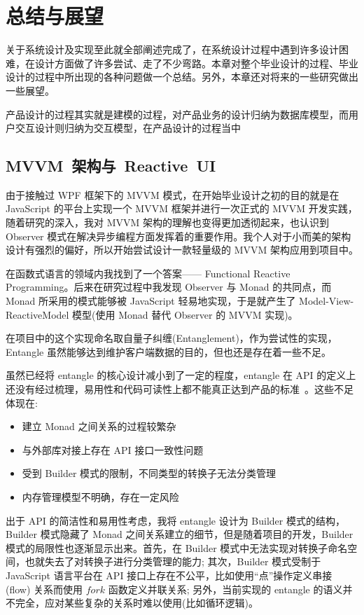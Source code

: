 \chapter{总结与展望}

关于系统设计及实现至此就全部阐述完成了，在系统设计过程中遇到许多设计困难，在设计方面做了许多尝试、走了不少弯路。本章对整个毕业设计的过程、毕业设计的过程中所出现的各种问题做一个总结。另外，本章还对将来的一些研究做出一些展望。

产品设计的过程其实就是建模的过程，对产品业务的设计归纳为数据库模型，而用户交互设计则归纳为交互模型，在产品设计的过程当中

\section{MVVM~架构与~Reactive~UI}

由于接触过 WPF 框架下的 MVVM 模式，在开始毕业设计之初的目的就是在 JavaScript 的平台上实现一个 MVVM 框架并进行一次正式的 MVVM 开发实践，随着研究的深入，我对 MVVM 架构的理解也变得更加透彻起来，也认识到 Observer 模式在解决异步编程方面发挥着的重要作用。我个人对于小而美的架构设计有强烈的偏好，所以开始尝试设计一款轻量级的 MVVM 架构应用到项目中。

在函数式语言的领域内我找到了一个答案—— Functional Reactive Programming。后来在研究过程中我发现 Observer 与 Monad 的共同点，而 Monad 所采用的模式能够被 JavaScript 轻易地实现，于是就产生了 Model-View-ReactiveModel 模型(使用 Monad 替代 Observer 的 MVVM 实现)。

在项目中的这个实现命名取自量子纠缠(Entanglement)，作为尝试性的实现，Entangle 虽然能够达到维护客户端数据的目的，但也还是存在着一些不足。

虽然已经将 entangle 的核心设计减小到了一定的程度，entangle 在 API 的定义上还没有经过梳理，易用性和代码可读性上都不能真正达到产品的标准~\cite{Gerken:2010:UCM:1753846.1754082}。这些不足体现在:

\begin{itemize}
  \item 建立 Monad 之间关系的过程较繁杂
  \item 与外部库对接上存在 API 接口一致性问题
  \item 受到 Builder 模式的限制，不同类型的转换子无法分类管理
  \item 内存管理模型不明确，存在一定风险
\end{itemize}

出于 API 的简洁性和易用性考虑，我将 entangle 设计为 Builder 模式的结构，Builder 模式隐藏了 Monad 之间关系建立的细节，但是随着项目的开发，Builder 模式的局限性也逐渐显示出来。首先，在 Builder 模式中无法实现对转换子命名空间，也就失去了对转换子进行分类管理的能力; 其次，Builder 模式受制于 JavaScript 语言平台在 API 接口上存在不公平，比如使用“点”操作定义串接 (flow) 关系而使用 $fork$ 函数定义并联关系; 另外，当前实现的 entangle 的语义并不完全，应对某些复杂的关系时难以使用(比如循环逻辑)。

